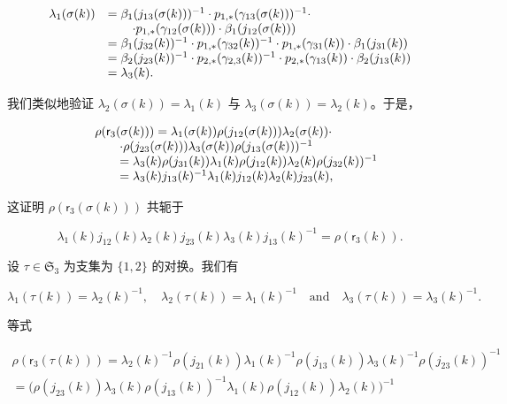 \[
\begin{array}{r l} \lambda_ {1} (\sigma (k)) & = \beta_ {1} (j _ {1 3} (\sigma (k))) ^ {- 1} \cdot p _ {1, *} (\gamma_ {1 3} (\sigma (k))) ^ {- 1} \cdot \\ & \qquad \cdot p _ {1, *} (\gamma_ {1 2} (\sigma (k))) \cdot \beta_ {1} (j _ {1 2} (\sigma (k))) \\ & = \beta_ {1} (j _ {3 2} (k)) ^ {- 1} \cdot p _ {1, *} (\gamma_ {3 2} (k)) ^ {- 1} \cdot p _ {1, *} (\gamma_ {3 1} (k)) \cdot \beta_ {1} (j _ {3 1} (k)) \\ & = \beta_ {2} (j _ {2 3} (k)) ^ {- 1} \cdot p _ {2, *} (\gamma_ {2, 3} (k)) ^ {- 1} \cdot p _ {2, *} (\gamma_ {1 3} (k)) \cdot \beta_ {2} (j _ {1 3} (k)) \\ & = \lambda_ {3} (k). \end{array}
\]

我们类似地验证 \(\lambda_2(\sigma(k)) = \lambda_1(k)\) 与 \(\lambda_3(\sigma(k)) = \lambda_2(k)\)。于是，

\[
\begin{array}{r l} & {\rho (\mathsf {r} _ {3} (\sigma (k))) = \lambda_ {1} (\sigma (k)) \rho (j _ {1 2} (\sigma (k))) \lambda_ {2} (\sigma (k)) \cdot} \\ & {\qquad \cdot \rho (j _ {2 3} (\sigma (k))) \lambda_ {3} (\sigma (k)) \rho (j _ {1 3} (\sigma (k))) ^ {- 1}} \\ & {\qquad = \lambda_ {3} (k) \rho (j _ {3 1} (k)) \lambda_ {1} (k) \rho (j _ {1 2} (k)) \lambda_ {2} (k) \rho (j _ {3 2} (k)) ^ {- 1}} \\ & {\qquad = \lambda_ {3} (k) j _ {1 3} (k) ^ {- 1} \lambda_ {1} (k) j _ {1 2} (k) \lambda_ {2} (k) j _ {2 3} (k),} \end{array}
\]

这证明 \(\rho(\mathsf{r}_3(\sigma(k)))\) 共轭于

\[
\lambda_ {1} (k) j _ {1 2} (k) \lambda_ {2} (k) j _ {2 3} (k) \lambda_ {3} (k) j _ {1 3} (k) ^ {- 1} = \rho (\mathsf {r} _ {3} (k)).
\]

设 \(\tau \in \mathfrak{S}_3\) 为支集为 \(\{1,2\}\) 的对换。我们有

\[
\lambda_ {1} (\tau (k)) = \lambda_ {2} (k) ^ {- 1}, \quad \lambda_ {2} (\tau (k)) = \lambda_ {1} (k) ^ {- 1} \quad \text {and} \quad \lambda_ {3} (\tau (k)) = \lambda_ {3} (k) ^ {- 1}.
\]

等式

\[
\begin{array}{c} \rho (\mathsf {r} _ {3} (\tau (k))) = \lambda_ {2} (k) ^ {- 1} \rho (j _ {2 1} (k)) \lambda_ {1} (k) ^ {- 1} \rho (j _ {1 3} (k)) \lambda_ {3} (k) ^ {- 1} \rho (j _ {2 3} (k)) ^ {- 1} \\ = \big (\rho (j _ {2 3} (k)) \lambda_ {3} (k) \rho (j _ {1 3} (k)) ^ {- 1} \lambda_ {1} (k) \rho (j _ {1 2} (k)) \lambda_ {2} (k) \big) ^ {- 1} \end{array}
\]

